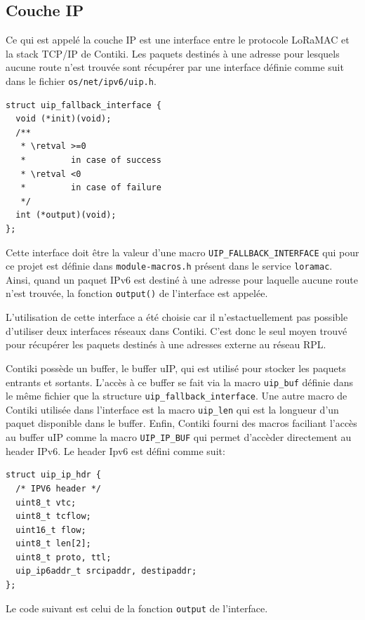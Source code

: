 \subsection*{Couche IP}
    Ce qui est appelé la couche IP est une interface entre le protocole LoRaMAC et la stack TCP/IP de Contiki. Les paquets destinés à une adresse pour lesquels aucune route n'est trouvée sont récupérer par une interface définie comme suit dans le fichier \texttt{os/net/ipv6/uip.h}.
    \begin{verbatim}
struct uip_fallback_interface {
  void (*init)(void);
  /**
   * \retval >=0
   *         in case of success
   * \retval <0
   *         in case of failure
   */
  int (*output)(void);
};
    \end{verbatim}
    Cette interface doit être la valeur d'une macro \texttt{UIP\_FALLBACK\_INTERFACE} qui pour ce projet est définie dans \texttt{module-macros.h} présent dans le service \texttt{loramac}.
    Ainsi, quand un paquet IPv6 est destiné à une adresse pour laquelle aucune route n'est trouvée, la fonction  \texttt{output()} de l'interface est appelée.

    L'utilisation de cette interface a été choisie car il n'estactuellement pas possible d'utiliser deux interfaces réseaux dans Contiki. C'est donc le seul moyen trouvé pour récupérer les paquets destinés à une adresses externe au réseau RPL.

    Contiki possède un buffer, le buffer uIP, qui est utilisé pour stocker les paquets entrants et sortants.
    L'accès à ce buffer se fait via la macro \texttt{uip\_buf} définie dans le même fichier que la structure \texttt{uip\_fallback\_interface}. Une autre macro de Contiki utilisée dans l'interface est la macro \texttt{uip\_len} qui est la longueur d'un paquet disponible dans le buffer. Enfin, Contiki fourni des macros faciliant l'accès au buffer uIP comme la macro \texttt{UIP\_IP\_BUF} qui permet d'accèder directement au header IPv6. Le header Ipv6 est défini comme suit:
    \begin{verbatim}
struct uip_ip_hdr {
  /* IPV6 header */
  uint8_t vtc;
  uint8_t tcflow;
  uint16_t flow;
  uint8_t len[2];
  uint8_t proto, ttl;
  uip_ip6addr_t srcipaddr, destipaddr;
};
    \end{verbatim}

    Le code suivant est celui de la fonction \texttt{output} de l'interface.

